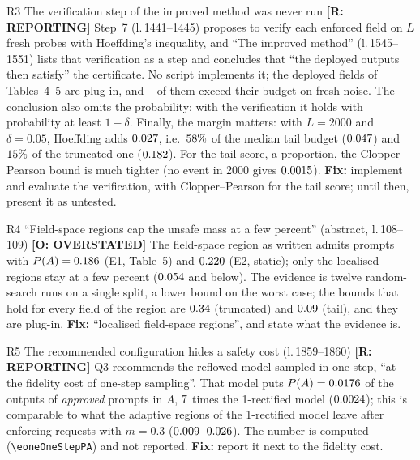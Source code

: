 \documentclass[11pt]{article}
\newcommand{\lin}[1]{l.\,#1}
\newcommand{\mac}[1]{\texttt{\textbackslash #1}}
\newcommand{\badge}[2]{\textcolor{#1}{\textbf{[#2]}}}
\newcommand{\Sover}{\badge{warnOr}{O: OVERSTATED}}
\newcommand{\Srep}{\badge{warnOr}{R: REPORTING}}
\begin{document}
\begin{findbox}{R3 \quad The verification step of the improved method was never run \hfill \Srep}
Step~7 (\lin{1441--1445}) proposes to verify each enforced field on $L$ fresh probes with Hoeffding's inequality, and ``The
improved method'' (\lin{1545--1551}) lists that verification as a step and concludes that ``the deployed outputs then satisfy''
the certificate. No script implements it; the deployed fields of Tables~4--5 are plug-in, and \eoneTwoPlugMin--\eoneTwoPlugMax{} of them exceed their
budget on fresh noise. The conclusion also omits the probability: with the verification it holds with probability at least
$1-\delta$. Finally, the margin matters: with $L=2000$ and $\delta=0.05$, Hoeffding adds $0.027$, i.e.\ $58\%$ of the median tail
budget ($0.047$) and $15\%$ of the truncated one ($0.182$). For the tail score, a proportion, the Clopper--Pearson bound
is much tighter (no event in 2000 gives $0.0015$). \textbf{Fix:} implement and evaluate the verification, with Clopper--Pearson
for the tail score; until then, present it as untested.
\end{findbox}

\begin{findbox}{R4 \quad ``Field-space regions cap the unsafe mass at a few percent'' (abstract, \lin{108--109}) \hfill \Sover}
The field-space region as written admits prompts with $P(A)=0.186$ (E1, Table~5) and $0.220$ (E2, static); only the localised
regions stay at a few percent ($0.054$ and below). The evidence is twelve random-search runs on a single split, a lower bound on
the worst case; the bounds that hold for every field of the region are $0.34$ (truncated) and $0.09$ (tail), and they are plug-in.
\textbf{Fix:} ``localised field-space regions'', and state what the evidence is.
\end{findbox}

\begin{findbox}{R5 \quad The recommended configuration hides a safety cost (\lin{1859--1860}) \hfill \Srep}
Q3 recommends the reflowed model sampled in one step, ``at the fidelity cost of one-step sampling''. That model puts
$P(A)=0.0176$ of the outputs of \emph{approved} prompts in $A$, $7$ times the 1-rectified model ($0.0024$); this is comparable to
what the adaptive regions of the 1-rectified model leave after enforcing requests with $m=0.3$ ($0.009$--$0.026$). The number is
computed (\mac{eoneOneStepPA}) and not reported. \textbf{Fix:} report it next to the fidelity cost.
\end{findbox}
\end{document}
